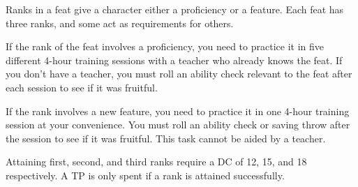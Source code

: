     Ranks in a feat give a character either a proficiency or a feature.
    Each feat has three ranks, and some act as requirements for others.



    If the rank of the feat involves a proficiency, you need to practice it in five different 4-hour training sessions with a teacher who already knows the feat.
    If you don't have a teacher, you must roll an ability check relevant to the feat after each session to see if it was fruitful.

    If the rank involves a new feature, you need to practice it in one 4-hour training session at your convenience.
    You must roll an ability check or saving throw after the session to see if it was fruitful.
    This task cannot be aided by a teacher.

    Attaining first, second, and third ranks require a DC of 12, 15, and 18 respectively.
    A TP is only spent if a rank is attained successfully.

